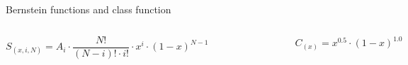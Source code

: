 \begin{frame}{Bernstein functions and class function}
    \begin{columns}
        \vspace{-0.5cm} 
        \begin{equation*}
            S_{(x, i, N)} = A_i \cdot \frac{N!}{(N - i)! \cdot i!} \cdot x^i \cdot (1 - x)^{N - 1}
        \end{equation*}
        \vspace{-0.5cm}
        \begin{figure}
            \includegraphics[width=\textwidth]{./images/bernstein.eps}
        \end{figure}
        \begin{equation*}
            C_{(x)} = x^{0.5} \cdot (1 - x)^{1.0}
        \end{equation*}
        \begin{figure}
            \includegraphics[width=\textwidth]{./images/class.eps}
        \end{figure}
    \end{columns}
\end{frame}

